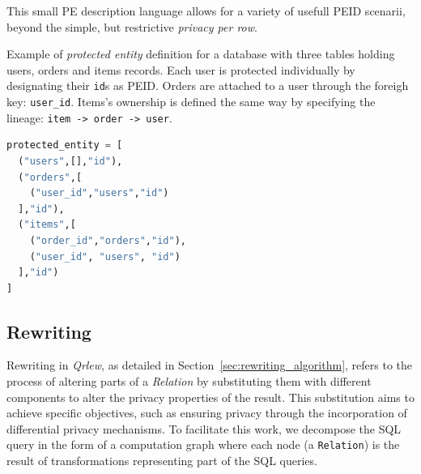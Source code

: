 \documentclass[letterpaper]{article} %
\newcommand{\qrlew}{\emph{Qrlew}}
\begin{document}
This small PE description language allows for a variety of usefull PEID scenarii, beyond the simple, but restrictive \emph{privacy per row}.


        
\begin{listing}[tb]
\caption{Example of \emph{protected entity} definition for a database with three tables holding users, orders and items records. Each user is protected individually by designating their \texttt{id}s as PEID. Orders are attached to a user through the foreigh key: \texttt{user\_id}. Items's ownership is defined the same way by specifying the lineage: \texttt{item -> order -> user}.}%
\label{lst:pe}
\begin{lstlisting}[language=Python]
protected_entity = [
  ("users",[],"id"),
  ("orders",[
    ("user_id","users","id")
  ],"id"),
  ("items",[
    ("order_id","orders","id"),
    ("user_id", "users", "id")
  ],"id")
]
\end{lstlisting}
\end{listing}

\subsection{Rewriting}
\label{sec:rewritting}

Rewriting in \qrlew{}, as detailed in Section~\ref{sec:rewriting_algorithm}, refers to the process of altering parts of a \emph{Relation} by substituting them with different components to alter the privacy properties of the result. This substitution aims to achieve specific objectives, such as ensuring privacy through the incorporation of differential privacy mechanisms. To facilitate this work, we decompose the SQL query in the form of a computation graph where each node (a \texttt{Relation}) is the result of transformations representing part of the SQL queries.
\end{document}
